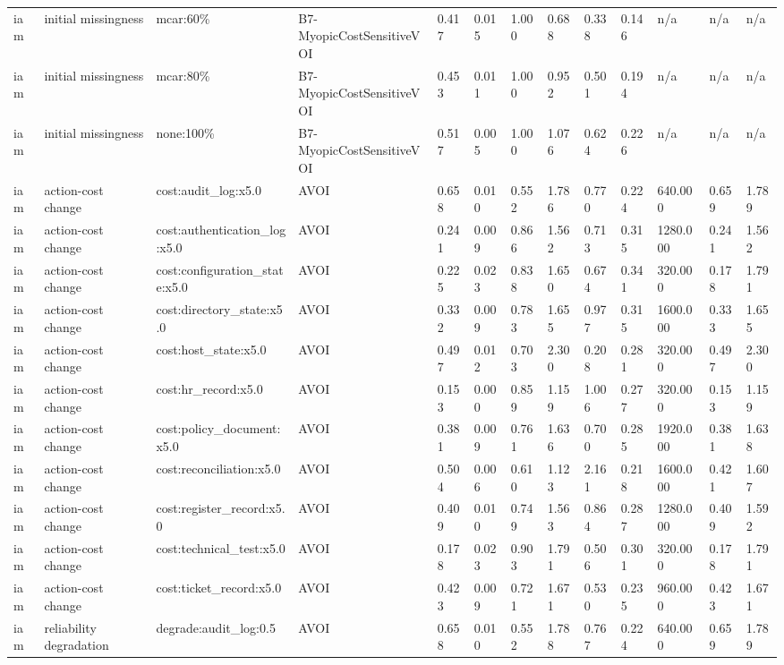 \begin{table}[!ht]
{\begin{tabular}{lllllllllllll}
iam & initial missingness & mcar:60\% & B7-MyopicCostSensitiveVOI & 0.417 & 0.015 & 1.000 & 0.688 & 0.338 & 0.146 & n/a & n/a & n/a \\
iam & initial missingness & mcar:80\% & B7-MyopicCostSensitiveVOI & 0.453 & 0.011 & 1.000 & 0.952 & 0.501 & 0.194 & n/a & n/a & n/a \\
iam & initial missingness & none:100\% & B7-MyopicCostSensitiveVOI & 0.517 & 0.005 & 1.000 & 1.076 & 0.624 & 0.226 & n/a & n/a & n/a \\
iam & action-cost change & cost:audit\_log:x5.0 & AVOI & 0.658 & 0.010 & 0.552 & 1.786 & 0.770 & 0.224 & 640.000 & 0.659 & 1.789 \\
iam & action-cost change & cost:authentication\_log:x5.0 & AVOI & 0.241 & 0.009 & 0.866 & 1.562 & 0.713 & 0.315 & 1280.000 & 0.241 & 1.562 \\
iam & action-cost change & cost:configuration\_state:x5.0 & AVOI & 0.225 & 0.023 & 0.838 & 1.650 & 0.674 & 0.341 & 320.000 & 0.178 & 1.791 \\
iam & action-cost change & cost:directory\_state:x5.0 & AVOI & 0.332 & 0.009 & 0.783 & 1.655 & 0.977 & 0.315 & 1600.000 & 0.333 & 1.655 \\
iam & action-cost change & cost:host\_state:x5.0 & AVOI & 0.497 & 0.012 & 0.703 & 2.300 & 0.208 & 0.281 & 320.000 & 0.497 & 2.300 \\
iam & action-cost change & cost:hr\_record:x5.0 & AVOI & 0.153 & 0.000 & 0.859 & 1.159 & 1.006 & 0.277 & 320.000 & 0.153 & 1.159 \\
iam & action-cost change & cost:policy\_document:x5.0 & AVOI & 0.381 & 0.009 & 0.761 & 1.636 & 0.700 & 0.285 & 1920.000 & 0.381 & 1.638 \\
iam & action-cost change & cost:reconciliation:x5.0 & AVOI & 0.504 & 0.006 & 0.610 & 1.123 & 2.161 & 0.218 & 1600.000 & 0.421 & 1.607 \\
iam & action-cost change & cost:register\_record:x5.0 & AVOI & 0.409 & 0.010 & 0.749 & 1.563 & 0.864 & 0.287 & 1280.000 & 0.409 & 1.592 \\
iam & action-cost change & cost:technical\_test:x5.0 & AVOI & 0.178 & 0.023 & 0.903 & 1.791 & 0.506 & 0.301 & 320.000 & 0.178 & 1.791 \\
iam & action-cost change & cost:ticket\_record:x5.0 & AVOI & 0.423 & 0.009 & 0.721 & 1.671 & 0.530 & 0.235 & 960.000 & 0.423 & 1.671 \\
iam & reliability degradation & degrade:audit\_log:0.5 & AVOI & 0.658 & 0.010 & 0.552 & 1.788 & 0.767 & 0.224 & 640.000 & 0.659 & 1.789 \\

\end{tabular}}
\end{table}
